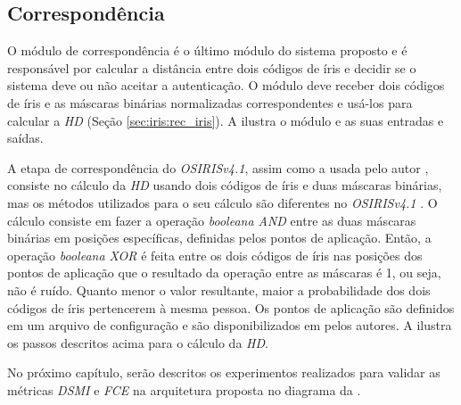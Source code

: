 \subsection{Correspondência}\label{sec:metodologia:correspondencia}

\par O módulo de correspondência é o último módulo do sistema proposto e é responsável por calcular a distância entre dois códigos de íris e decidir se o sistema deve ou não aceitar a autenticação. O módulo deve receber dois códigos de íris e as máscaras binárias normalizadas correspondentes e usá-los para calcular a \textit{\acrfull{HD}} (Seção \ref{sec:iris:rec_iris}). A  ilustra o módulo e as suas entradas e saídas.


\par A etapa de correspondência do \textit{OSIRISv4.1}, assim como a usada pelo autor \cite{daugman2004}, consiste no cálculo da \textit{\acrshort{HD}} usando dois códigos de íris e duas máscaras binárias, mas os métodos utilizados para o seu cálculo são diferentes no \textit{OSIRISv4.1} \cite{osirisv41_doc}. O cálculo consiste em fazer a operação \textit{booleana AND} entre as duas máscaras binárias em posições específicas, definidas pelos pontos de aplicação. Então, a operação \textit{booleana XOR} é feita entre os dois códigos de íris nas posições dos pontos de aplicação que o resultado da operação entre as máscaras é 1, ou seja, não é ruído. Quanto menor o valor resultante, maior a probabilidade dos dois códigos de íris pertencerem à mesma pessoa. Os pontos de aplicação são definidos em um arquivo de configuração e são disponibilizados em \cite{osirisv41} pelos autores. A  ilustra os passos descritos acima para o cálculo da \textit{\acrshort{HD}}.

\par No próximo capítulo, serão descritos os experimentos realizados para validar as métricas \textit{\acrshort{DSMI}} e \textit{\acrshort{FCE}} na arquitetura proposta no diagrama da .

